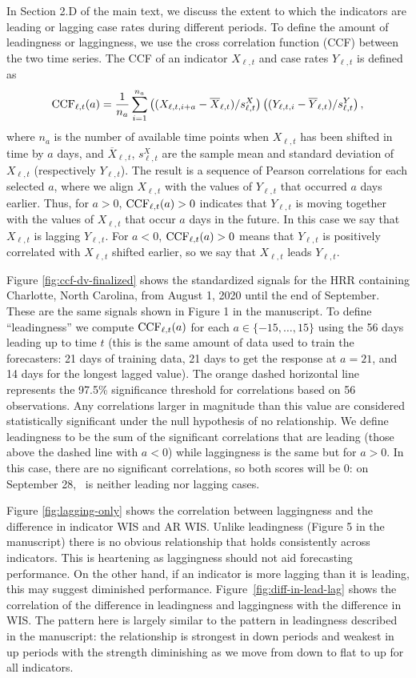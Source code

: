 In Section 2.D of the main text, we discuss the extent to which the indicators
are leading or lagging case rates during different periods. To define the amount
of leadingness or laggingness, we use the cross correlation function (CCF)
between the two time series. The CCF of an indicator $X_{\ell,t}$ and case
rates $Y_{\ell,t}$ is defined as
\[
\mathrm{CCF}_{\ell,t}(a) = \frac{1}{n_a} \sum_{i=1}^{n_a} \left( ( X_{\ell,t,i+a} -
  \overline{X}_{\ell,t}) / s^{X}_{\ell,t}\right) \left( ( Y_{\ell,t,i} -
  \overline{Y}_{\ell,t}) / s^{Y}_{\ell,t}\right), 
\]
where $n_a$ is the number of available time points when $X_{\ell,t}$ has been
shifted in time by $a$ days, and $\overline{X}_{\ell,t}$, $s^X_{\ell,t}$
are the sample mean and
standard deviation of $X_{\ell,t}$ (respectively $Y_{\ell,t}$). The result is a
sequence of Pearson correlations for each selected $a$, where we align
$X_{\ell,t}$ with the values of $Y_{\ell,t}$ that occurred $a$ days earlier.
Thus, for $a>0$, $\mathrm{CCF}_{\ell,t}(a)>0$ indicates that
$Y_{\ell,t}$ is moving together with the values of $X_{\ell,t}$ that occur $a$
days in the future. In this case we say that $X_{\ell,t}$ is lagging
$Y_{\ell,t}$. For $a<0$, $\mathrm{CCF}_{\ell,t}(a)>0$ means that $Y_{\ell,t}$ is
positively correlated with $X_{\ell,t}$ shifted earlier, so we say that
$X_{\ell,t}$ leads $Y_{\ell,t}$.

Figure \ref{fig:ccf-dv-finalized} shows the standardized signals for the HRR
containing Charlotte, North Carolina, from August 1, 2020 until the end of
September. These are the same signals shown in Figure 1 in the manuscript. To
define ``leadingness'' we compute $\mathrm{CCF}_{\ell,t}(a)$ for each $a\in
\{-15,\ldots,15\}$ using the 56 days leading up to time $t$ (this is the same
amount of data used to train the forecasters: 21 days of training data, 21 days
to get the response at $a=21$, and 14 days for the longest lagged value). The
orange dashed horizontal line represents the 97.5\% significance threshold for
correlations based on 56 observations. Any correlations larger in magnitude than
this value are considered statistically significant under the null hypothesis of
no relationship. We define leadingness to be the sum of the significant
correlations that are leading (those above the dashed line with $a<0$) while
laggingness is the same but for $a>0$. In this case, there are no significant
correlations, so both scores will be 0: on September 28, \dv~is neither
leading nor lagging cases.

Figure \ref{fig:lagging-only} shows the correlation between laggingness and the
difference in indicator WIS and AR WIS. Unlike leadingness (Figure 5 in the
manuscript) there is no obvious relationship that holds consistently
across indicators. This is heartening as laggingness
should not aid forecasting performance. On the other hand, if an indicator is
more lagging than it is leading, this may suggest diminished performance.
Figure~\ref{fig:diff-in-lead-lag} shows the correlation of the difference in
leadingness and laggingness with the difference in WIS. The pattern here is
largely similar to the pattern in leadingness described in the manuscript: the
relationship is strongest in down periods and weakest in up periods with the
strength diminishing as we move from down to flat to up for all indicators. 

